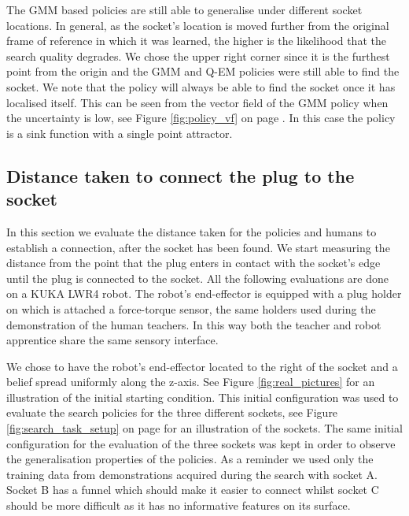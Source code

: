 \documentclass[final,3p,times,twocolumn]{elsarticle}
\begin{document}
The GMM based policies are still able to generalise under different socket locations. In general, as the socket's location is moved 
further from the original frame of reference in which it was learned, the higher is the likelihood that the search quality degrades. We 
chose the upper right corner since it is the furthest point from the origin and the GMM and Q-EM policies were still able to find 
the socket. We note that the policy will always be able to find the socket once it has localised itself. This can be seen from the vector field 
of the GMM policy when the uncertainty is low, see Figure \ref{fig:policy_vf} on page \pageref{fig:policy_vf}. In this case the policy is a sink function 
with a single point attractor.

\subsection{Distance taken to connect the plug to the socket}
In this section we evaluate the distance taken for the policies and humans to establish a connection, after the socket 
has been found. We start measuring the distance 
from the point that the plug enters in contact with the socket's edge until the plug is connected to the socket. All the following evaluations are done 
on a KUKA LWR4 robot. The robot's end-effector is equipped with a plug holder on which is attached a force-torque sensor, 
the same holders used during the demonstration of the human teachers. In this way both the teacher and robot apprentice share 
the same sensory interface.

We chose to have the robot's end-effector located to the right of the socket and a belief spread uniformly 
along the z-axis. See Figure \ref{fig:real_pictures} for an illustration of the initial starting condition.
This initial configuration was used to evaluate the search policies for the three different sockets, see Figure \ref{fig:search_task_setup} 
on page \pageref{fig:search_task_setup} for an illustration of the sockets. The same initial configuration for 
the evaluation of the three sockets was kept in order to observe the generalisation properties of the policies. 
As a reminder we used only the training data from demonstrations acquired during the search with socket A. Socket B has a funnel which should make it 
easier to connect whilst socket C should be more difficult as it has no informative features on its surface. 
\end{document}
